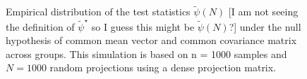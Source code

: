 \documentclass[times,sort&compress,3p]{elsarticle}
\theoremstyle{plain}%
\theoremstyle{definition}
\begin{document}
\begin{figure}[H]
  \centering
{}
\caption{Empirical distribution of the test statistics $\widetilde{\psi}(N)$ {\color{blue}[I am not seeing the definition of $\widetilde{\psi}^\star$ so I guess this might be $\widetilde{\psi}(N)$?]} under the null hypothesis of common mean vector and common covariance matrix across groups. This simulation is based on n = 1000 samples and $N = 1000$ random projections using a dense projection matrix.}
  \label{fig:BFh0}
\end{figure}
  
\end{document}
